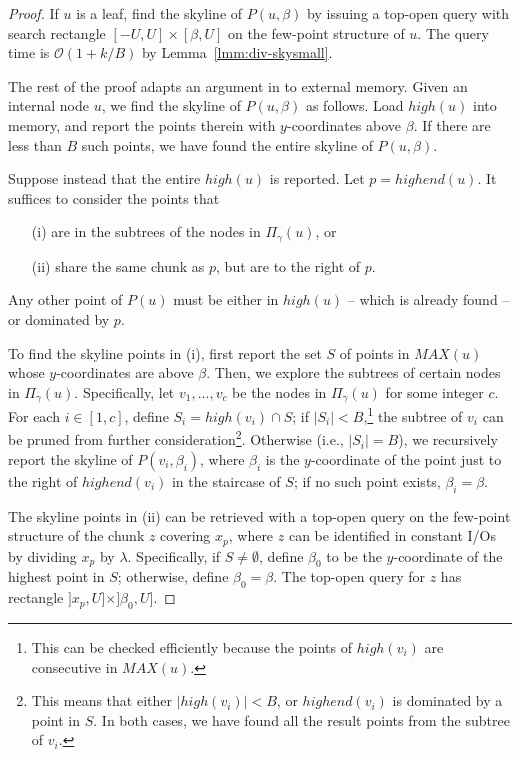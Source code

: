 \documentclass{sig-alternate}
\DeclareMathOperator*{\intr}{\cap}
\def\high{\mathit{high}}
\def\highend{\mathit{highend}}
\def\MAX{\mathit{MAX}}
\def\intr{\cap}
\newcommand{\bigO}{\mathcal{O}}
\renewcommand{\(}{\left(}
\renewcommand{\)}{\right)}
\begin{document}
\begin{fullenv}
\begin{proof}
  If $u$ is a leaf, find the skyline of $P(u, \beta)$ by issuing a top-open
  query with search rectangle $[-U, U] \times [\beta, U]$ on the few-point
  structure of $u$. The query time is $\bigO(1 + k/B)$ by
  Lemma~\ref{lmm:div-skysmall}.

  The rest of the proof adapts an argument in \cite{BT11} to external memory.
  Given an internal node $u$, we find the skyline of $P(u, \beta)$ as follows.
  Load $\high(u)$ into memory, and report the points therein with
  $y$-coordinates above $\beta$. If there are less than $B$ such points, we
  have found the entire skyline of $P(u, \beta)$.

  Suppose instead that the entire $\high(u)$ is reported. Let $p =
  \highend(u)$. It suffices to consider the points that
	\begin{itemize}
		\item[(i)] are in the subtrees of the nodes in $\Pi_\gamma(u)$, or

		\item[(ii)] share the same chunk as $p$, but are to the right of $p$.
	\end{itemize}
  Any other point of $P(u)$ must be either in $\high(u)$ -- which is already
  found -- or dominated by $p$.

  To find the skyline points in (i), first report the set $S$ of points in
  $\MAX(u)$ whose $y$-coordinates are above $\beta$. Then, we explore the
  subtrees of certain nodes in $\Pi_\gamma(u)$. Specifically, let $v_1, ...,
  v_c$ be the nodes in $\Pi_\gamma(u)$ for some integer $c$. For each $i \in
  [1, c]$, define $S_i = \high(v_i) \intr S$; if $|S_i| < B$,\footnote{This can
  be checked efficiently because the points of $\high(v_i)$ are consecutive in
  $MAX(u)$.} the subtree of $v_i$ can be pruned from further
  consideration\footnote{This means that either $|\high(v_i)| < B$, or
  $\highend(v_i)$ is dominated by a point in $S$. In both cases, we have found
  all the result points from the subtree of $v_i$.}. Otherwise (i.e., $|S_i| =
  B$), we recursively report the skyline of $P(v_i, \beta_i)$, where $\beta_i$
  is the $y$-coordinate of the point just to the right of $\highend(v_i)$ in the
  staircase of $S$; if no such point exists, $\beta_i = \beta$.

  The skyline points in (ii) can be retrieved with a top-open query on the
  few-point structure of the chunk $z$ covering $x_p$, where $z$ can be
  identified in constant I/Os by dividing $x_p$ by $\lambda$. Specifically, if
  $S \neq \emptyset$, define $\beta_0$ to be the $y$-coordinate of the highest
  point in $S$; otherwise, define $\beta_0 = \beta$. The top-open query for $z$
  has rectangle $]x_p, U] \times ]\beta_0, U]$.


\end{proof}
\end{fullenv}
\end{document}
